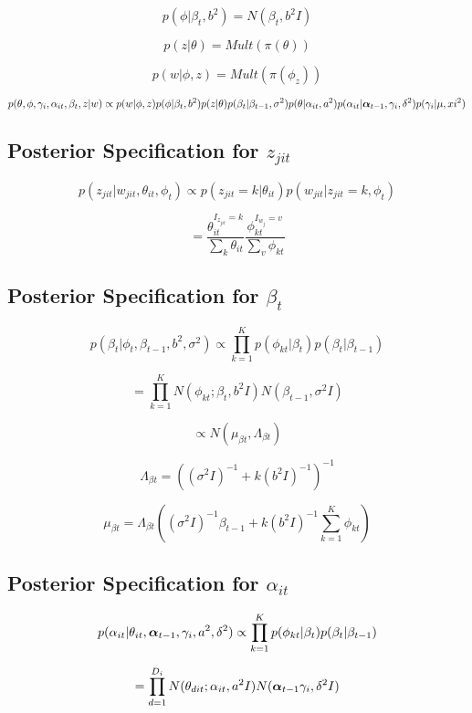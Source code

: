 \documentclass[a4paper]{article}
\begin{document}
\[p(\phi | \beta_t, b^2) = N(\beta_t, b^2I)\]

\[p(z| \theta) = Mult(\pi(\theta))\]

\[p(w | \phi, z) = Mult(\pi(\phi_z))\]

\[p(\theta, \phi, \gamma_i, \alpha_{it}, \beta_t, z | w) \propto p(w | \phi, z) p(\phi |  \beta_t, b^2)  p(z | \theta)  p(\beta_t | \beta_{t-1}, \sigma^2) p(\theta | \alpha_{it}, a^2) p(\alpha_{it} | \text{\boldmath$\alpha$}_{t-1}, \gamma_i, \delta^2) p(\gamma_i | \mu, xi^2)\]

\subsection{Posterior Specification for $z_{jit}$}

\[p(z_{jit} | w_{jit}, \theta_{it}, \phi_t) \propto p(z_{jit} = k | \theta_{it}) p(w_{jit} | z_{jit} = k, \phi_t)\]

\[= \frac{\theta_{it}^{I_{z_{jit}}=k}}{\sum_k \theta_{it}} \frac{\phi_{kt}^{I_{w_j}=v}}{\sum_v \phi_{kt}}\]

\subsection{Posterior Specification for $\beta_t$}

\[p(\beta_t | \phi_t, \beta_{t-1}, b^2, \sigma^2) \propto \prod_{k=1}^K p(\phi_{kt} | \beta_t) p(\beta_t | \beta_{t-1})\]

\[= \prod_{k=1}^K N(\phi_{kt};\beta_t, b^2I) N(\beta_{t-1}, \sigma^2I)\]

\[\propto N(\mu_{\beta t}, \Lambda_{\beta t})\]

\[\Lambda_{\beta t} = ((\sigma^2I)^{-1} + k (b^2I)^{-1})^{-1}\]

\[\mu_{\beta t} = \Lambda_{\beta t} \left((\sigma^2I)^{-1}\beta_{t-1} + k (b^2I)^{-1} \sum_{k=1}^K \phi_{kt}\right) \]

\subsection{Posterior Specification for $\alpha_{it}$}

\[p(\alpha_{it} | \theta_{it}, \text{\boldmath$\alpha$}_{t-1}, \gamma_i, a^2, \delta^2) \propto \prod_{k=1}^K p(\phi_{kt} | \beta_t) p(\beta_t | \beta_{t-1})\]

\[= \prod_{d=1}^{D_i} N(\theta_{dit};\alpha_{it}, a^2I) N(\text{\boldmath$\alpha$}_{t-1}\gamma_i, \delta^2I)\]
\end{document}

